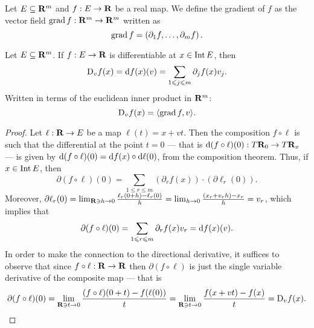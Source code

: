 \begin{definition}[Gradient]
    Let \(E \subseteq \mathbf{R}^m\) and \(f: E \to \mathbf{R}\) be a real map. We define the
    gradient of \(f\) as the vector field \(\operatorname{grad} f: \mathbf{R}^m \to \mathbf{R}^m\) written as
    \[
        \operatorname{grad} f = \left( \partial_1 f, \dots, \partial_m f \right).
    \]
\end{definition}

\begin{corollary}
    Let \(E \subseteq \mathbf{R}^m\). If \(f: E \to \mathbf{R}\) is differentiable at \(x \in \operatorname{Int}
    E\), then
    \[
        \mathrm{D}_v f(x) = \mathrm{d} f(x)(v) = \sum_{1 \leqslant j \leqslant m} \partial_j f(x) v_j.
    \]
    Written in terms of the euclidean inner product in \(\mathbf{R}^m\):
    \[
        \mathrm{D}_v f(x) = \langle \operatorname{grad} f, v \rangle.
    \]
\end{corollary}

\begin{proof}
    Let \(\ell: \mathbf{R} \to E\) be a map \(\ell(t) = x + v t\). Then the composition
    \(f \circ \ell\) is such that the differential at the point \(t = 0\) --- that
    is \(\mathrm{d} (f \circ \ell)(0): T\mathbf{R}_0 \to T\mathbf{R}_x\) --- is given by \(\mathrm{d} (f
    \circ \ell)(0) = \mathrm{d} f(x) \circ \mathrm{d} \ell(0)\), from the composition
    theorem. Thus, if \(x \in \operatorname{Int} E\), then
    \[
        \partial (f \circ \ell)(0) =
        \sum_{1 \leq r \leq m}
        (\partial_r f(x)) \cdot (\partial \ell_r(0)).
    \]
    Moreover, \(\partial \ell_r(0) = \lim_{\mathbf{R} \ni h \to 0} \frac{\ell_r(0 + h) -
        \ell_r(0)}{h}  = \lim_{h \to 0} \frac{(x_r + v_r h) - x_r}{h} = v_r\), which
    implies that
    \[
        \partial (f\circ \ell)(0) = \sum_{1 \leqslant r \leqslant m} \partial_r f(x) v_r =
        \mathrm{d} f(x)(v).
    \]
    In order to make the connection to the directional derivative, it suffices to
    observe that since \(f \circ \ell: \mathbf{R} \to \mathbf{R}\) then \(\partial (f \circ
    \ell)\) is just the single variable derivative of the composite map ---
    that is
    \[
        \partial (f \circ \ell)(0) =
        \lim_{\mathbf{R} \ni t \to 0} \frac{(f \circ \ell)(0 + t) - f(\ell(0))} t =
        \lim_{\mathbf{R} \ni t \to 0} \frac{f(x + vt) - f(x)} t = \mathrm{D}_v f(x).
    \]
\end{proof}

